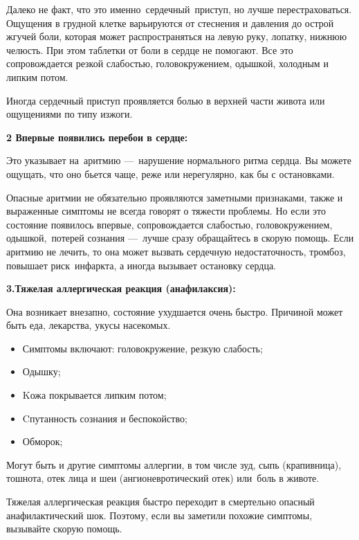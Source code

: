 \documentclass[a4paper, 12pt]{article}
\theoremstyle{definition}
\begin{document}
        Далеко не факт, что это именно сердечный приступ, но лучше перестраховаться. Ощущения в грудной клетке варьируются от стеснения и давления до острой жгучей боли, которая может распространяться на левую руку, лопатку, нижнюю челюсть. При этом таблетки от боли в сердце не помогают. Все это сопровождается резкой слабостью, головокружением, одышкой, холодным и липким потом.

        Иногда сердечный приступ проявляется болью в верхней части живота или ощущениями по типу изжоги. 

        \textbf{2 Впервые появились перебои в сердце:}

        Это указывает на аритмию — нарушение нормального ритма сердца. Вы можете ощущать, что оно бьется чаще, реже или нерегулярно, как бы с остановками. 
        
        Опасные аритмии не обязательно проявляются заметными признаками, также и выраженные симптомы не всегда говорят о тяжести проблемы. Но если это состояние появилось впервые, сопровождается слабостью, головокружением, одышкой, потерей сознания — лучше сразу обращайтесь в скорую помощь. Если аритмию не лечить, то она может вызвать сердечную недостаточность, тромбоз, повышает риск инфаркта, а иногда вызывает остановку сердца. 

        \textbf{3.Тяжелая аллергическая реакция (анафилаксия):}

        Она возникает внезапно, состояние ухудшается очень быстро. Причиной может быть еда, лекарства, укусы насекомых.
        
        \begin{itemize}
            \item  Симптомы включают: головокружение, резкую слабость;
            \item Одышку;
            \item Kожа покрывается липким потом;
            \item Cпутанность сознания и беспокойство;
            \item Обморок;
        \end{itemize}

        Могут быть и другие симптомы аллергии, в том числе зуд, сыпь (крапивница), тошнота, отек лица и шеи (ангионевротический отек) или боль в животе.

        Тяжелая аллергическая реакция быстро переходит в смертельно опасный анафилактический шок. Поэтому, если вы заметили похожие симптомы, вызывайте скорую помощь.
\end{document}
